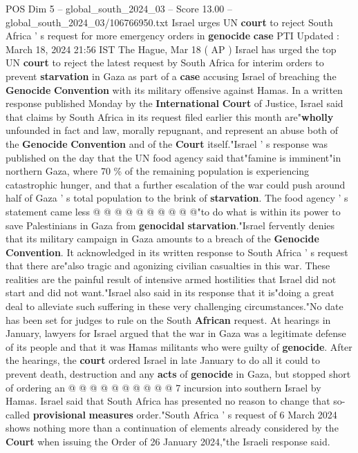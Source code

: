 \begin{textsample}{POS Dim 5 – global\_south\_2024\_03 – Score 13.00 – global\_south\_2024\_03/106766950.txt}  \label{ex:f5_pos_246}
Israel urges UN \textbf{court} to reject South Africa ' s request for more emergency orders in \textbf{genocide} \textbf{case} PTI Updated : March 18, 2024 21:56 IST The Hague, Mar 18 ( AP ) Israel has urged the top UN \textbf{court} to reject the latest request by South Africa for interim orders to prevent \textbf{starvation} in Gaza as part of a \textbf{case} accusing Israel of breaching the \textbf{Genocide} \textbf{Convention} with its military offensive against Hamas.
In a written response published Monday by the \textbf{International} \textbf{Court} of Justice, Israel said that claims by South Africa in its request filed earlier this month are"\textbf{wholly} unfounded in fact and law, morally repugnant, and represent an abuse both of the \textbf{Genocide} \textbf{Convention} and of the \textbf{Court} itself."Israel ' s response was published on the day that the UN food agency said that"famine is imminent"in northern Gaza, where 70 \% of the remaining population is experiencing catastrophic hunger, and that a further escalation of the war could push around half of Gaza ' s total population to the brink of \textbf{starvation}.
The food agency ' s statement came less @ @ @ @ @ @ @ @ @ @"to do what is within its power to save Palestinians in Gaza from \textbf{genocidal} \textbf{starvation}."Israel fervently denies that its military campaign in Gaza amounts to a breach of the \textbf{Genocide} \textbf{Convention}.
It acknowledged in its written response to South Africa ' s request that there are"also tragic and agonizing civilian casualties in this war.
These realities are the painful result of intensive armed hostilities that Israel did not start and did not want."Israel also said in its response that it is"doing a great deal to alleviate such suffering in these very challenging circumstances."No date has been set for judges to rule on the South \textbf{African} request.
At hearings in January, lawyers for Israel argued that the war in Gaza was a legitimate defense of its people and that it was Hamas militants who were guilty of \textbf{genocide}.
After the hearings, the \textbf{court} ordered Israel in late January to do all it could to prevent death, destruction and any \textbf{acts} of \textbf{genocide} in Gaza, but stopped short of ordering an @ @ @ @ @ @ @ @ @ @ 7 incursion into southern Israel by Hamas.
Israel said that South Africa has presented no reason to change that so-called \textbf{provisional} \textbf{measures} order."South Africa ' s request of 6 March 2024 shows nothing more than a continuation of elements already considered by the \textbf{Court} when issuing the Order of 26 January 2024,"the Israeli response said.

\end{textsample}
